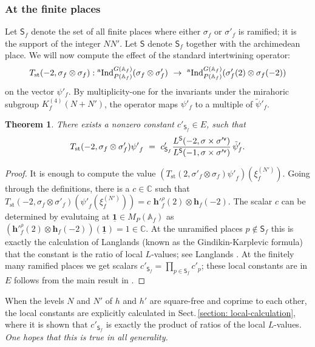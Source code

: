 \documentclass[11pt]{amsart}
\newtheorem{theorem}{Theorem}[section]
\newcommand{\A}{\mathbb A}
\newcommand{\aInd}{{}^{\rm a}{\rm Ind}}
\newcommand{\sfv}{{\sf v}}
\newcommand{\mirf}[1]{K_f^{(4)}(#1)}
\begin{document}
\subsubsection{At the finite places}

Let $\mathsf{S}_f$ denote the set of all finite places where either $\sigma_f$ or $\sigma'_f$ is ramified; it is the support of the integer $NN'.$ Let 
$\mathsf{S}$ denote $\mathsf{S}_f$ together with the archimedean place. 
We will now compute the effect of the standard intertwining operator:
$$
T_{\rm st}(-2, \sigma_f \otimes \sigma_f): 
\aInd_{P(\A_f)}^{G(\A_f)}(\sigma_f \otimes \sigma'_f) \ \rightarrow \ 
\aInd_{P(\A_f)}^{G(\A_f)}( \sigma'_f(2) \otimes \sigma_f(-2))
$$
on the vector $\psi'_f$. By multiplicity-one for the invariants under the mirahoric subgroup $\mirf{N+N'}$, the operator maps  $\psi'_f$ to a multiple of $\tilde{\psi}'_f$. 



\begin{theorem}
\label{thm:ratios-of-l-values-finite}
There exists a nonzero constant $c'_{\mathsf{S}_f} \in E$, such that 
	\[ T_{\text{st}}(-2, \sigma_f \otimes \sigma'_f) {\psi'}_f \ = \ 
	c'_{\mathsf{S}_f}\frac{L^\mathsf{S}(-2, \sigma \times \sigma'^\sfv)}{L^\mathsf{S}(-1, \sigma \times \sigma'^\sfv)}\, \tilde{\psi}_f'.\] 
\end{theorem}
\begin{proof}
It is enough to compute the value
	$\left(T_{\text{st}}(2, \sigma'_f \otimes \sigma_f) {\psi'}_f\right)(\xi_f^{(N')}).$ Going through the definitions, there is a $c \in \mathbb{C}$ such that 
$T_{\text{st}}(-2, \sigma_f \otimes \sigma'_f) ({\psi'}_f(\xi_f^{(N')})) = c \,\,\mathbf{h}'^\rho_f(2) \otimes \mathbf{h}_f(-2).$
	The scalar $c$ can be determined by evalutaing at $\underline{\mathbf{1}} \in M_P(\mathbb{A}_f)$ as $(\mathbf{h}'^\rho_f(2) \otimes \mathbf{h}_f(-2))(\underline{\mathbf{1}}) = 1 \in \mathbb{C}.$
	At the unramified places $p \notin \mathsf{S}_f$ this is exactly the calculation of Langlands (known as the Gindikin-Karplevic formula) 
	that the constant is the ratio of local $L$-values; see Langlands \cite{langlands}. 
	At the finitely many ramified places we get scalars $c'_{\mathsf{S}_f} = \prod_{p \in \mathsf{S}_f} c'_p$; these  
	local constants are in $E$ follows from the main result in \cite{raghuram-cjm}. 
\end{proof}

When the levels $N$ and $N'$ of $h$ and $h'$ are square-free and coprime to each other, the local constants are explicitly 
calculated in Sect.\,\ref{section: local-calculation}, 
where it is shown that $c'_{\mathsf{S}_f}$ is exactly the product of ratios of the local $L$-values. {\it One hopes that this is true in all generality.} 
\end{document}
